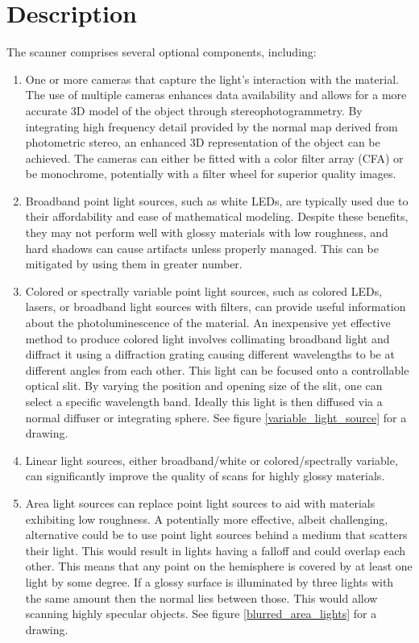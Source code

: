 \documentclass[11pt, twoside, listof=totocnumbered, bibliography=totocnumbered]{scrartcl}
\begin{document}
\section{Description}
The scanner comprises several optional components, including:
\begin{enumerate}
	\item One or more cameras that capture the light's interaction with the material. The use of multiple cameras enhances data availability and allows for a more accurate 3D model of the object through stereophotogrammetry. By integrating high frequency detail provided by the normal map derived from photometric stereo, an enhanced 3D representation of the object can be achieved. The cameras can either be fitted with a color filter array (CFA) or be monochrome, potentially with a filter wheel for superior quality images.
	
	\item Broadband point light sources, such as white LEDs, are typically used due to their affordability and ease of mathematical modeling. Despite these benefits, they may not perform well with glossy materials with low roughness, and hard shadows can cause artifacts unless properly managed. This can be mitigated by using them in greater number.
	
	\item Colored or spectrally variable point light sources, such as colored LEDs, lasers, or broadband light sources with filters, can provide useful information about the photoluminescence of the material. An inexpensive yet effective method to produce colored light involves collimating broadband light and diffract it using a diffraction grating causing different wavelengths to be at different angles from each other. This light can be focused onto a controllable optical slit. By varying the position and opening size of the slit, one can select a specific wavelength band. Ideally this light is then diffused via a normal diffuser or integrating sphere. See figure \ref{variable_light_source} for a drawing.

	\item Linear light sources, either broadband/white or colored/spectrally variable, can significantly improve the quality of scans for highly glossy materials. \cite{LINEAR_LIGHT}
	
	\item Area light sources can replace point light sources to aid with materials exhibiting low roughness. \cite{PS_AreaLights} A potentially more effective, albeit challenging, alternative could be to use point light sources behind a medium that scatters their light. This would result in lights having a falloff and could overlap each other. This means that any point on the hemisphere is covered by at least one light by some degree. If a glossy surface is illuminated by three lights with the same amount then the normal lies between those. This would allow scanning highly specular objects. See figure \ref{blurred_area_lights} for a drawing.
	 

\end{enumerate}
\end{document}
